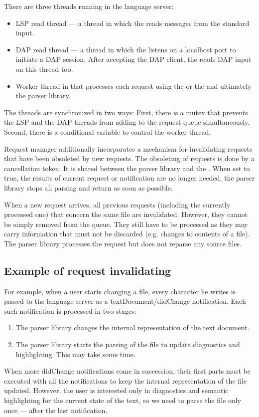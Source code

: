 There are three threads running in the language server:
\begin{itemize}
	\item LSP read thread --- a thread in which the  reads messages from the standard input.
	\item DAP read thread --- a thread in which the  listens on a localhost port to initiate a DAP session. After accepting the DAP client, the  reads DAP input on this thread too.
	\item Worker thread in  that processes each request using the  or the  and ultimately the parser library.
\end{itemize}

The threads are synchronized in two ways: First, there is a mutex that prevents the LSP and the DAP threads from adding to the request queue simultaneously. Second, there is a conditional variable to control the worker thread.

Request manager additionally incorporates a mechanism for invalidating requests that have been obsoleted by new requests. The obsoleting of requests is done by a cancellation token. It is shared between the parser library and the . When set to true, the results of current request or notification are no longer needed, the parser library stops all parsing and return as soon as possible.

When a new request arrives, all previous requests (including the currently processed one) that concern the same file are invalidated. However, they cannot be simply removed from the queue. They still have to be processed as they may carry information that must not be discarded (e.g. changes to contents of a file). The parser library processes the request but does not reparse any source files.

\subsection{Example of request invalidating}

For example, when a user starts changing a file, every character he writes is passed to the language server as a textDocument/didChange notification. Each such notification is processed in two stages:
\begin{enumerate}
	\item The parser library changes the internal representation of the text document.
	\item The parser library starts the parsing of the file to update diagnostics and highlighting. This may take some time.
\end{enumerate}
When more didChange notifications come in succession, their first parts must be executed with all the notifications to keep the internal representation of the file updated. However, the user is interested only in diagnostics and semantic highlighting for the current state of the text, so we need to parse the file only once --- after the last notification.



